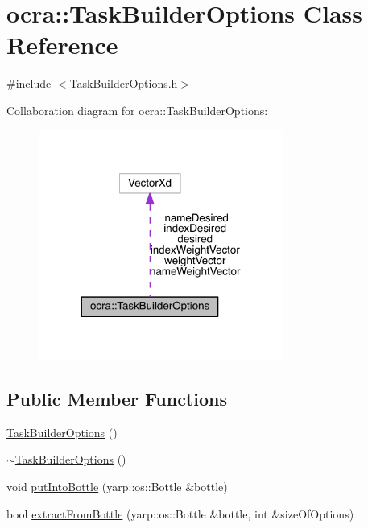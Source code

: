 \hypertarget{classocra_1_1TaskBuilderOptions}{}\section{ocra\+:\+:Task\+Builder\+Options Class Reference}
\label{classocra_1_1TaskBuilderOptions}


{\ttfamily \#include $<$Task\+Builder\+Options.\+h$>$}



Collaboration diagram for ocra\+:\+:Task\+Builder\+Options\+:\nopagebreak
\begin{figure}[H]
\begin{center}
\leavevmode
\includegraphics[width=228pt]{d8/de3/classocra_1_1TaskBuilderOptions__coll__graph}
\end{center}
\end{figure}
\subsection*{Public Member Functions}
\begin{DoxyCompactItemize}
\item 
\hyperlink{classocra_1_1TaskBuilderOptions_a99045de3fc12a569cb9a2bf6b60bbc34}{Task\+Builder\+Options} ()
\item 
\hyperlink{classocra_1_1TaskBuilderOptions_a25342a6bc49b3d63c9e512e73ff1721c}{$\sim$\+Task\+Builder\+Options} ()
\item 
void \hyperlink{classocra_1_1TaskBuilderOptions_abc99093a68bc991fa711aa6a7e55506a}{put\+Into\+Bottle} (yarp\+::os\+::\+Bottle \&bottle)
\item 
bool \hyperlink{classocra_1_1TaskBuilderOptions_a60271152310747f327d76d1f6557df4c}{extract\+From\+Bottle} (yarp\+::os\+::\+Bottle \&bottle, int \&size\+Of\+Options)
\end{DoxyCompactItemize}
